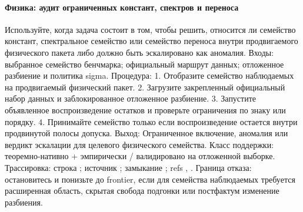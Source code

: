 \paragraph{Физика: аудит ограниченных констант, спектров и переноса}
Используйте, когда задача состоит в том, чтобы решить, относится ли семейство констант, спектральное семейство или семейство переноса внутри продвигаемого физического пакета либо должно быть эскалировано как аномалия.
Входы: выбранное семейство бенчмарка; \allowbreak официальный маршрут данных; \allowbreak отложенное разбиение и политика sigma.
Процедура: 1. Отобразите семейство наблюдаемых на продвигаемый физический пакет. 2. Загрузите закрепленный официальный набор данных и заблокированное отложенное разбиение. 3. Запустите объявленное воспроизведение остатков и проверьте ограничения по знаку или порядку. 4. Принимайте семейство только если воспроизведение остается внутри продвинутой полосы допуска.
Выход: Ограниченное включение, аномалия или вердикт эскалации для целевого физического семейства.
Класс поддержки: теоремно-нативно + эмпирически / валидировано на отложенной выборке.
Трассировка: строка ; \allowbreak источник ; \allowbreak замыкание ; \allowbreak refs , \allowbreak {}.
Граница отказа: остановитесь и понизьте до frontier, если для семейства наблюдаемых требуется расширенная область, скрытая свобода подгонки или постфактум изменение разбиения.

